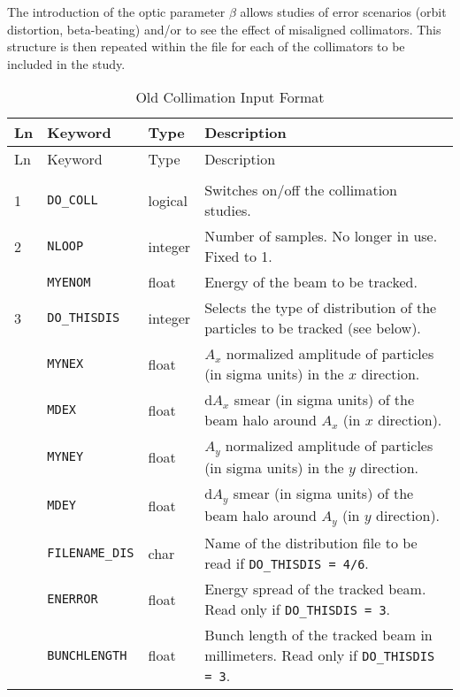 The introduction of the optic parameter $\beta$ allows studies of error scenarios (orbit distortion, beta-beating) and/or to see the effect of misaligned collimators.
This structure is then repeated within the file for each of the collimators to be included in the study.

\bigskip
\begin{center}
\begin{longtable}{| p{0.5cm} | p{2.4cm} | p{1.2cm} | >{\raggedright\arraybackslash}p{11.4cm}|}
    \caption{Old Collimation Input Format}
    \label{tab:COLL_INP} \\*
    \hline
    \rowcolor{blue!30}
    Ln & Keyword & Type & Description \\*
    \hline
    \endfirsthead

    \hline
    \rowcolor{blue!30}
    Ln & Keyword & Type & Description \\*
    \hline
    \endhead

    \rowcolor{gray!15}
    \multicolumn{4}{|c|}{(The table continues on the next page)}\\*
    \hline
    \endfoot

    \hline
    \endlastfoot

    1   & \texttt{DO\_COLL}      & logical & Switches on/off the collimation studies. \\
    \hline

    2   & \texttt{NLOOP}         & integer & Number of samples. No longer in use. Fixed to 1. \\
        \cline{2-4}
        & \texttt{MYENOM}        & float   & Energy of the beam to be tracked. \\
    \hline

    3   & \texttt{DO\_THISDIS}   & integer & Selects the type of distribution of the particles to be tracked (see below). \\
        \cline{2-4}
        & \texttt{MYNEX}         & float   & $A_x$ normalized amplitude of particles (in sigma units) in the $x$ direction. \\
        \cline{2-4}
        & \texttt{MDEX}          & float   & $\mbox{d}A_x$ smear (in sigma units) of the beam halo around $A_x$ (in $x$ direction). \\
        \cline{2-4}
        & \texttt{MYNEY}         & float   & $A_y$ normalized amplitude of particles (in sigma units) in the $y$ direction. \\
        \cline{2-4}
        & \texttt{MDEY}          & float   & $\mbox{d}A_y$ smear (in sigma units) of the beam halo around $A_y$ (in $y$ direction). \\
        \cline{2-4}
        & \texttt{FILENAME\_DIS} & char    & Name of the distribution file to be read if \texttt{DO\_THISDIS = 4/6}. \\
        \cline{2-4}
        & \texttt{ENERROR}       & float   & Energy spread of the tracked beam. Read only if \texttt{DO\_THISDIS = 3}. \\
        \cline{2-4}
        & \texttt{BUNCHLENGTH}   & float   & Bunch length of the tracked beam in millimeters. Read only if \texttt{DO\_THISDIS = 3}. \\
    \hline


\end{longtable}
\end{center}
